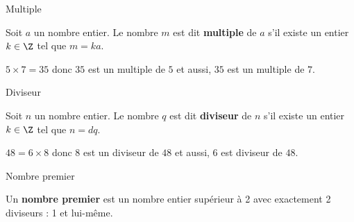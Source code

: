 \begin{pageCours}
\begin{DefT}{Multiple}

Soit $a$ un nombre entier. Le nombre $m$ est dit \textbf{multiple} de $a$ s'il existe un entier $k \in \Z$ tel que $m=ka$.
\end{DefT}

\begin{Ex} 

$5 \times 7 = 35$ donc $35$ est un multiple de $5$ et aussi,  $35$ est un multiple de $7$.
\end{Ex}

\begin{DefT}{Diviseur}

Soit $n$ un nombre entier. Le nombre $q$ est dit \textbf{diviseur} de $n$ s'il existe un entier $k \in \Z$ tel que $n=dq$.
\end{DefT}

\begin{Ex} 

$48 = 6 \times 8$ donc $8$ est un diviseur de $48$ et aussi,  $6$ est diviseur de $48$.
\end{Ex}

\begin{DefT}{Nombre premier}

Un \textbf{nombre premier} est un nombre entier supérieur à 2 avec exactement 2 diviseurs : 1 et lui-même. 

\end{DefT}





\end{pageCours} 

